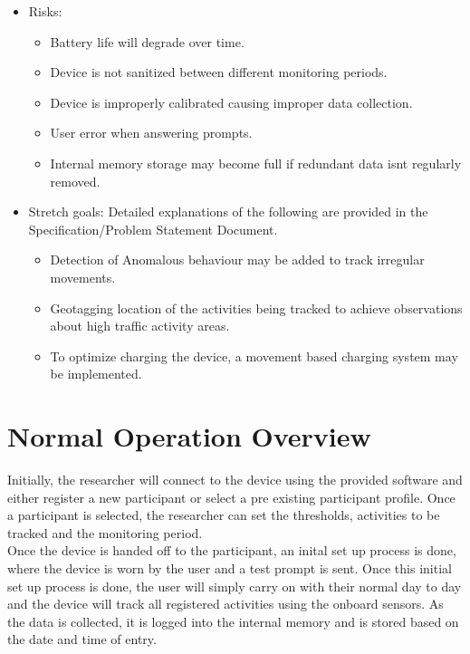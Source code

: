 \documentclass[12pt]{article}
\begin{document}
\begin{itemize}
\item Risks:
	\begin{itemize}
		\item Battery life will degrade over time.
		\item Device is not sanitized between different monitoring periods.
		\item Device is improperly calibrated causing improper data collection.
		\item User error when answering prompts.
		\item Internal memory storage may become full if redundant data isnt regularly removed.
	\end{itemize}

\item Stretch goals: Detailed explanations of the following are provided in the Specification/Problem Statement Document.
	\begin{itemize}
		\item Detection of Anomalous behaviour may be added to track irregular movements.
		\item Geotagging location of the activities being tracked to achieve observations about high traffic activity areas.
		\item To optimize charging the device, a movement based charging system may be implemented.
	\end{itemize}
\end{itemize}

\section{Normal Operation Overview}
\label{NOO}
\setlength{\parindent}{20pt}
Initially, the researcher will connect to the device using the provided software and either register a new participant or select a pre existing participant profile. Once a participant is selected, the researcher can set the thresholds, activities to be tracked and the monitoring period. \\

Once the device is handed off to the participant, an inital set up process is done, where the device is worn by the user and a test prompt is sent. Once this initial set up process is done, the user will simply carry on with their normal day to day and the device will track all registered activities using the onboard sensors. As the data is collected, it is logged into the internal memory and is stored based on the date and time of entry.\\
\end{document}
